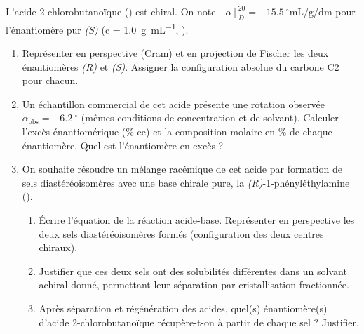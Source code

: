 \documentclass[11pt]{article}
\providecommand{\degree}{^{\circ}}
\begin{document}
\begin{exercice}
L'acide 2-chlorobutanoïque () est chiral. On note $[\alpha]_D^{20} = \SI{-15,5}{\degree\milli\liter\per\gram\per\deci\meter}$ pour l'énantiomère pur \textit{(S)} (c = \SI{1,0}{\gram\per\milli\liter}, ).
\begin{enumerate}
    \item Représenter en perspective (Cram) et en projection de Fischer les deux énantiomères \textit{(R)} et \textit{(S)}. Assigner la configuration absolue du carbone C2 pour chacun.
    \item Un échantillon commercial de cet acide présente une rotation observée $\alpha_{\text{obs}} = \SI{-6,2}{\degree}$ (mêmes conditions de concentration et de solvant). Calculer l'excès énantiomérique (\% ee) et la composition molaire en \% de chaque énantiomère. Quel est l'énantiomère en excès ?
    \item On souhaite résoudre un mélange racémique de cet acide par formation de sels diastéréoisomères avec une base chirale pure, la \textit{(R)}-1-phényléthylamine ().
    \begin{enumerate}
        \item Écrire l'équation de la réaction acide-base. Représenter en perspective les deux sels diastéréoisomères formés (configuration des deux centres chiraux).
        \item Justifier que ces deux sels ont des solubilités différentes dans un solvant achiral donné, permettant leur séparation par cristallisation fractionnée.
        \item Après séparation et régénération des acides, quel(s) énantiomère(s) d'acide 2-chlorobutanoïque récupère-t-on à partir de chaque sel ? Justifier.
    \end{enumerate}
\end{enumerate}
\end{exercice}
\end{document}
